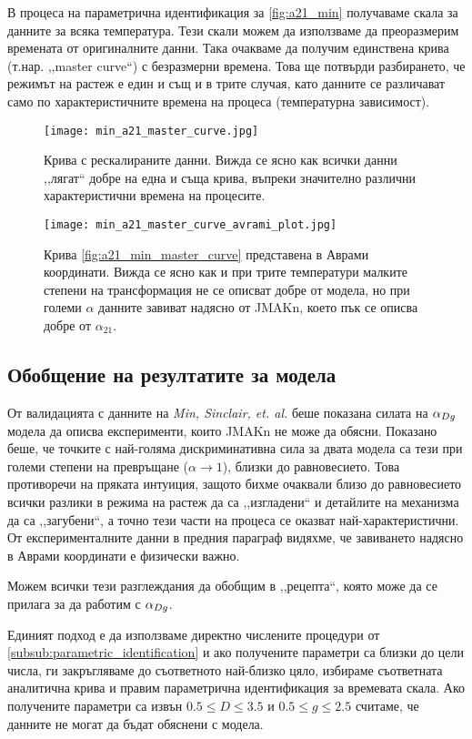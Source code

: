 В процеса на параметрична идентификация за \autoref{fig:a21_min} получаваме скала за данните за всяка температура. Тези скали можем да използваме да преоразмерим времената от оригиналните данни. Така очакваме да получим единствена крива (т.нар. ,,master curve``) с безразмерни времена. Това ще потвърди разбирането, че режимът на растеж е един и същ и в трите случая, като данните се различават само по характеристичните времена на процеса (температурна зависимост).
\begin{figure}[hbpt]
    \centering
    \texttt{[image: min\_a21\_master\_curve.jpg]}
    \caption{Крива с рескалираните данни. Вижда се ясно как всички данни ,,лягат`` добре на една и съща крива, въпреки значително различни характеристични времена на процесите.} 
    \label{fig:a21_min_master_curve}
\end{figure}
\begin{figure}[hbpt]
    \centering
    \texttt{[image: min\_a21\_master\_curve\_avrami\_plot.jpg]}
    \caption{Крива \autoref{fig:a21_min_master_curve} представена в Аврами координати. Вижда се ясно как и при трите температури малките степени на трансформация не се описват добре от модела, но при големи $\alpha$ данните завиват надясно от JMAKn, което пък се описва добре от $\alpha_{21}$.}
    \label{fig:a21_min_master_curve_avrami}
\end{figure}

\subsection{Обобщение на резултатите за модела}
От валидацията с данните на \textit{Min, Sinclair, et. al.} \cite{Min2005} беше показана силата на $\alpha_{Dg}$ модела да описва експерименти, които JMAKn не може да обясни. Показано беше, че точките с най-голяма дискриминативна сила за двата модела са тези при големи степени на превръщане ($\alpha \rightarrow 1$), близки до равновесието. Това противоречи на пряката интуиция, защото бихме очаквали близо до равновесието всички разлики в режима на растеж да са ,,изгладени`` и детайлите на механизма да са ,,загубени``, а точно тези части на процеса се оказват най-характеристични. От експерименталните данни в предния параграф видяхме, че завиването надясно в Аврами координати е физически важно.

Можем всички тези разглеждания да обобщим в ,,рецепта``, която може да се прилага за да работим с $\alpha_{Dg}$.

Единият подход е да използваме директно числените процедури от \autoref{subsub:parametric_identification} и ако получените параметри са близки до цели числа, ги закръгляваме до съответното най-близко цяло, избираме съответната аналитична крива и правим параметрична идентификация за времевата скала. Ако получените параметри са извън $ 0.5 \le D \le 3.5$ и $0.5 \le g \le 2.5$ считаме, че данните не могат да бъдат обяснени с модела. 

